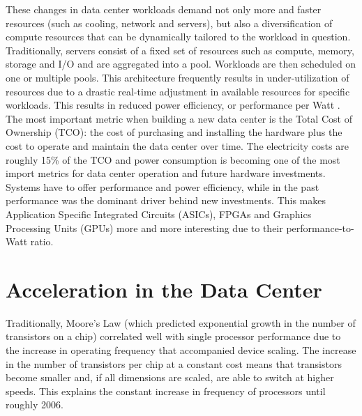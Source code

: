 These changes in data center workloads demand not only more and faster resources (such as cooling, network and servers), but also a diversification of compute resources that can be dynamically tailored to the workload in question. Traditionally, servers consist of a fixed set of resources such as compute, memory, storage and I/O and are aggregated into a pool. Workloads are then scheduled on one or multiple pools. This architecture frequently results in under-utilization of resources due to a drastic real-time adjustment in available resources for specific workloads. This results in reduced power efficiency, or performance per Watt \cite{rambus}. The most important metric when building a new data center is the Total Cost of Ownership (TCO): the cost of purchasing and installing the hardware plus the cost to operate and maintain the data center over time. The electricity costs are roughly 15\% of the TCO \cite{research-cloud} and power consumption is becoming one of the most import metrics for data center operation and future hardware investments. Systems have to offer performance and power efficiency, while in the past performance was the dominant driver behind new investments. This makes Application Specific Integrated Circuits (ASICs), FPGAs and Graphics Processing Units (GPUs) more and more interesting due to their performance-to-Watt ratio.







\section{Acceleration in the Data Center}
Traditionally, Moore's Law (which predicted exponential growth in the number of transistors on a chip) correlated well with single processor performance due to the increase in operating frequency that accompanied device scaling. The increase in the number of transistors per chip at a constant cost means that transistors become smaller and, if all dimensions are scaled, are able to switch at higher speeds. This explains the constant increase in frequency of processors until roughly 2006.






